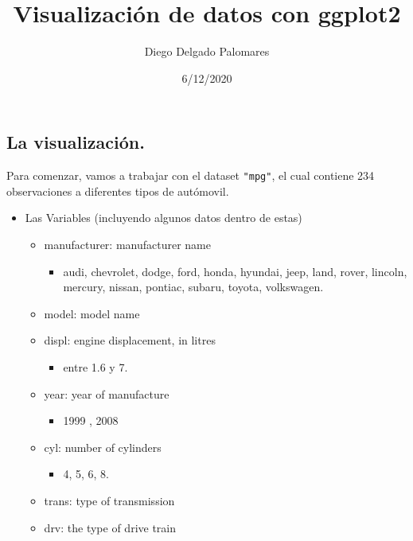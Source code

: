 \documentclass[
]{article}
\title{Visualización de datos con ggplot2}
\author{Diego Delgado Palomares}
\date{6/12/2020}
\providecommand{\tightlist}{%
  \setlength{\itemsep}{0pt}\setlength{\parskip}{0pt}}
\begin{document}
\maketitle

\hypertarget{la-visualizaciuxf3n.}{%
\subsection{La visualización.}\label{la-visualizaciuxf3n.}}

Para comenzar, vamos a trabajar con el dataset \texttt{"mpg"}, el cual
contiene 234 observaciones a diferentes tipos de autómovil.

\begin{itemize}
\item
  Las Variables (incluyendo algunos datos dentro de estas)

  \begin{itemize}
  \item
    manufacturer: manufacturer name

    \begin{itemize}
    \tightlist
    \item
      audi, chevrolet, dodge, ford, honda, hyundai, jeep, land, rover,
      lincoln, mercury, nissan, pontiac, subaru, toyota, volkswagen.
    \end{itemize}
  \item
    model: model name
  \item
    displ: engine displacement, in litres

    \begin{itemize}
    \tightlist
    \item
      entre 1.6 y 7.
    \end{itemize}
  \item
    year: year of manufacture

    \begin{itemize}
    \tightlist
    \item
      1999 , 2008
    \end{itemize}
  \item
    cyl: number of cylinders

    \begin{itemize}
    \tightlist
    \item
      4, 5, 6, 8.
    \end{itemize}
  \item
    trans: type of transmission
  \item
    drv: the type of drive train


\end{itemize}
\end{itemize}
\end{document}
